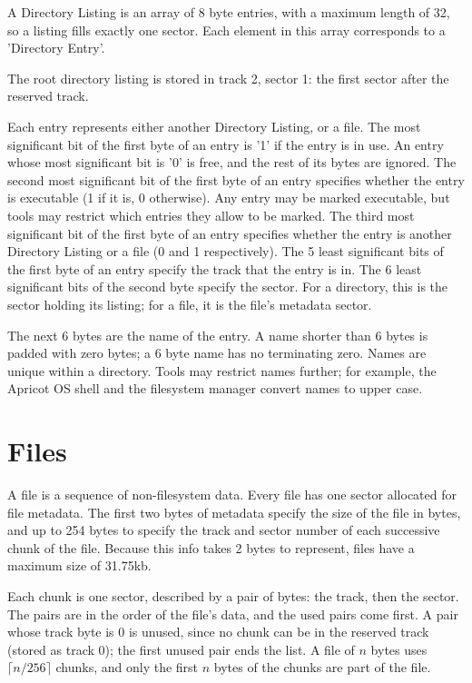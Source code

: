 \documentclass{article}
\begin{document}
A Directory Listing is an array of 8 byte entries, with a maximum length of 32, so a listing fills exactly one sector.
Each element in this array corresponds to a 'Directory Entry'.

The root directory listing is stored in track 2, sector 1: the first sector after the reserved track.

Each entry represents either another Directory Listing, or a file. The most significant bit of the first byte of an entry is '1' if the entry
is in use. An entry whose most significant bit is '0' is free, and the rest of its bytes are ignored.
The second most significant bit of the first byte of an entry specifies whether the entry is executable
(1 if it is, 0 otherwise). Any entry may be marked executable, but tools may restrict which entries they allow to be marked.
The third most significant bit of the first byte of an entry specifies whether the entry is another Directory Listing or a file (0 and 1 respectively).
The 5 least significant bits of the first byte of an entry specify the track that the entry is in. The 6 least significant bits of the second byte specify the sector.
For a directory, this is the sector holding its listing; for a file, it is the file's metadata sector.

The next 6 bytes are the name of the entry. A name shorter than 6 bytes is padded with zero bytes; a 6 byte name has no terminating zero.
Names are unique within a directory. Tools may restrict names further; for example, the Apricot OS shell and the filesystem manager
convert names to upper case.

\section{Files}

A file is a sequence of non-filesystem data. Every file has one sector allocated for file metadata. The first two bytes of metadata specify the size of the
file in bytes, and up to 254 bytes to specify the track and sector number of each successive chunk of the file. Because this info takes 2 bytes to represent,
files have a maximum size of 31.75kb.

Each chunk is one sector, described by a pair of bytes: the track, then the sector. The pairs are in the order of the file's data, and the used pairs come first.
A pair whose track byte is 0 is unused, since no chunk can be in the reserved track (stored as track 0); the first unused pair ends the list.
A file of $n$ bytes uses $\lceil n / 256 \rceil$ chunks, and only the first $n$ bytes of the chunks are part of the file.
\end{document}
